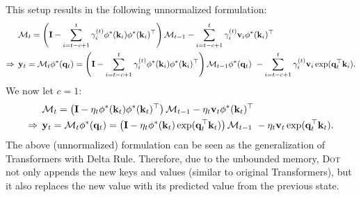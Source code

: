  This setup results in the following unnormalized formulation:
\begin{align}
     &\mathcal{M}_t = \left( \mathbf{I} - \sum_{i = t-c+1}^{t} \gamma^{(t)}_i \phi^{*}(\mathbf{k}_i)\phi^{*}(\mathbf{k}_i)^{\top} \right)  \mathcal{M}_{t-1} - \sum_{i = t-c+1}^{t} \gamma^{(t)}_i \mathbf{v}_i\phi^{*}(\mathbf{k}_i)^{\top} \\ 
     \Rightarrow \:\:&\mathbf{y}_t = \mathcal{M}_t \phi^{*}(\mathbf{q}_t) = \left( \mathbf{I} - \sum_{i = t-c+1}^{t} \gamma^{(t)}_i \phi^{*}(\mathbf{k}_i)\phi^{*}(\mathbf{k}_i)^{\top} \right)  \mathcal{M}_{t-1} \phi^{*}(\mathbf{q}_t) \ - \sum_{i = t-c+1}^{t} \gamma^{(t)}_i \mathbf{v}_i\exp(\mathbf{q}_t^{\top}\mathbf{k}_i). 
\end{align}
 We now let $c = 1$:
\begin{align}
    &\mathcal{M}_t = \left( \mathbf{I} - \eta_t \phi^{*}(\mathbf{k}_t)\phi^{*}(\mathbf{k}_t)^{\top} \right)  \mathcal{M}_{t-1} - \eta_t \mathbf{v}_t \phi^{*}(\mathbf{k}_t)^{\top} \\ 
    \Rightarrow \:\: &\mathbf{y}_t = \mathcal{M}_t \phi^{*}(\mathbf{q}_t) = \left( \mathbf{I} - \eta_t \phi^{*}(\mathbf{k}_t)\exp(\mathbf{q}_t^{\top}\mathbf{k}_t) \right)  \mathcal{M}_{t-1} \ - \eta_t \mathbf{v}_t\exp(\mathbf{q}_t^{\top}\mathbf{k}_t). 
\end{align}
The above (unnormalized) formulation can be seen as the generalization of Transformers with Delta Rule. Therefore, due to the unbounded memory, \textsc{Dot} not only appends the new keys and values (similar to original Transformers), but it also replaces the new value with its predicted value from the previous state. 


